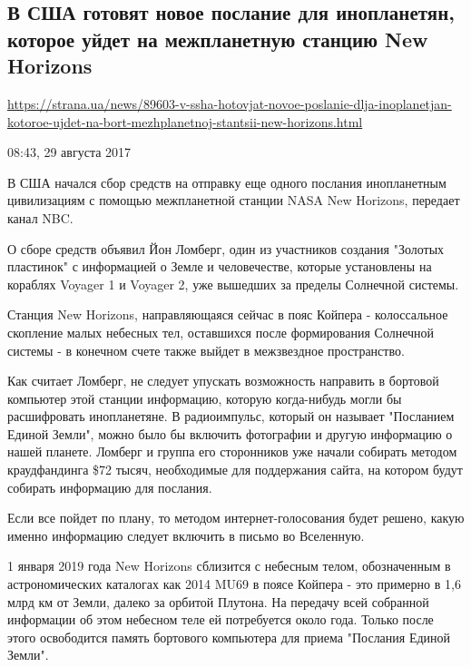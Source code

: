  
 

\subsection{В США готовят новое послание для инопланетян, которое уйдет на межпланетную станцию New Horizons}

\url{https://strana.ua/news/89603-v-ssha-hotovjat-novoe-poslanie-dlja-inoplanetjan-kotoroe-ujdet-na-bort-mezhplanetnoj-stantsii-new-horizons.html}

08:43, 29 августа 2017

В США начался сбор средств на отправку еще одного послания инопланетным
цивилизациям с помощью межпланетной станции NASA New Horizons, передает канал
NBC.

О сборе средств объявил Йон Ломберг, один из участников создания "Золотых
пластинок" с информацией о Земле и человечестве, которые установлены на
кораблях Voyager 1 и Voyager 2, уже вышедших за пределы Солнечной системы. 

Станция New Horizons, направляющаяся сейчас в пояс Койпера - колоссальное
скопление малых небесных тел, оставшихся после формирования Солнечной системы -
в конечном счете также выйдет в межзвездное пространство.

Как считает Ломберг, не следует упускать возможность направить в бортовой
компьютер этой станции информацию, которую когда-нибудь могли бы расшифровать
инопланетяне. В радиоимпульс, который он называет "Посланием Единой Земли",
можно было бы включить фотографии и другую информацию о нашей планете. Ломберг
и группа его сторонников уже начали собирать методом краудфандинга \$72 тысяч,
необходимые для поддержания сайта, на котором будут собирать информацию для
послания.

Если все пойдет по плану, то методом интернет-голосования будет решено, какую
именно информацию следует включить в письмо во Вселенную.

1 января 2019 года New Horizons сблизится с небесным телом, обозначенным в
астрономических каталогах как 2014 MU69 в поясе Койпера - это примерно в 1,6
млрд км от Земли, далеко за орбитой Плутона. На передачу всей собранной
информации об этом небесном теле ей потребуется около года. Только после этого
освободится память бортового компьютера для приема "Послания Единой Земли".

